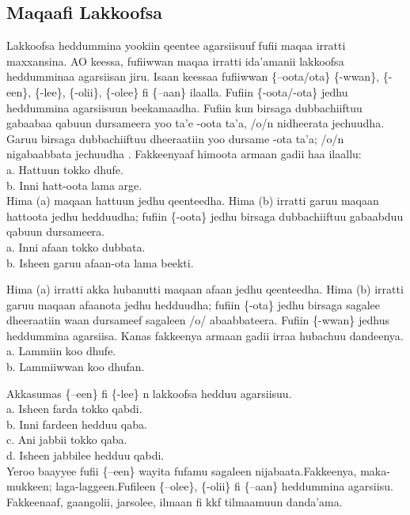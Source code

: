 \documentclass[11pt,b5paper]{book}
\begin{document}
\subsection{Maqaafi Lakkoofsa}

Lakkoofsa heddummina yookiin qeentee agarsiisuuf fufii maqaa irratti maxxansina. AO keessa, fufiiwwan maqaa irratti ida'amanii lakkoofsa heddumminaa agarsiisan jiru. Isaan keessaa fufiiwwan \{–oota/ota\} \{-wwan\}, \{-een\}, \{-lee\}, \{-olii\}, \{-olee\} fi \{–aan\} ilaalla. Fufiin \{-oota/-ota\} jedhu heddummina agarsiisuun beekamaadha\cite{griefenow2001grammatical}. Fufiin kun birsaga dubbachiiftuu gabaabaa qabuun dursameera yoo ta'e {-oota} ta'a, /o/n
nidheerata jechuudha. Garuu birsaga dubbachiiftuu dheeraatiin yoo dursame {-ota} ta'a; /o/n nigabaabbata jechuudha . Fakkeenyaaf himoota armaan gadii haa ilaallu: \\
a. Hattuun tokko dhufe.\\
b. Inni hatt-oota lama arge. \\

Hima (a) maqaan hattuun jedhu qeenteedha. Hima (b) irratti garuu maqaan hattoota jedhu hedduudha; fufiin \{-oota\} jedhu birsaga dubbachiiftuu gabaabduu qabuun dursameera. \\
a. Inni afaan tokko dubbata.\\
b. Isheen garuu afaan-ota lama beekti.

Hima (a) irratti akka hubanutti maqaan afaan jedhu qeenteedha. Hima (b) irratti garuu maqaan afaanota jedhu hedduudha; fufiin \{-ota\} jedhu birsaga sagalee dheeraatiin waan dursameef sagaleen /o/ abaabbateera. Fufiin \{-wwan\} jedhus heddummina agarsiisa. Kanas fakkeenya armaan gadii irraa hubachuu dandeenya. \\
a. Lammiin koo dhufe.\\
b. Lammiiwwan koo dhufan.

Akkasumas \{–een\} fi \{-lee\} n lakkoofsa hedduu agarsiisuu. \\
a. Isheen farda tokko qabdi.\\
b. Inni fardeen hedduu qaba.\\
c. Ani jabbii tokko qaba.\\
d. Isheen jabbilee hedduu qabdi. \\

Yeroo baayyee fufii \{–een\} wayita fufamu sagaleen nijabaata.Fakkeenya, maka-mukkeen; laga-laggeen.Fufileen \{–olee\}, \{-olii\} fi \{–aan\} heddummina agarsiisu. Fakkeenaaf,
gaangolii, jarsolee, ilmaan fi kkf tilmaamuun danda'ama.
\end{document}
